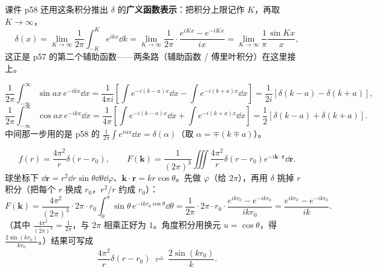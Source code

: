 \documentclass[11pt]{ctexart}
\begin{document}
课件 p58 还用这条积分推出 $\delta$ 的\textbf{广义函数表示}：把积分上限记作 $K$，再取 $K\to\infty$，
\[
\delta(x)=\lim_{K\to\infty}\frac{1}{2\pi}\int_{-K}^{K}e^{ikx}\dd k
=\lim_{K\to\infty}\frac{1}{2\pi}\cdot\frac{e^{iKx}-e^{-iKx}}{ix}
=\lim_{K\to\infty}\frac{1}{\pi}\frac{\sin Kx}{x} ,
\]
这正是 p57 的第二个辅助函数——两条路（辅助函数 / 傅里叶积分）在这里接上。



\[
\frac{1}{2\pi}\int_{-\infty}^{\infty}\sin ax\,e^{-ikx}\dd x
=\frac{1}{4\pi i}\left[\int e^{-i(k-a)x}\dd x-\int e^{-i(k+a)x}\dd x\right]
=\frac{1}{2i}\left[\delta(k-a)-\delta(k+a)\right],
\]
\[
\frac{1}{2\pi}\int_{-\infty}^{\infty}\cos ax\,e^{-ikx}\dd x
=\frac{1}{4\pi}\left[\int e^{-i(k-a)x}\dd x+\int e^{-i(k+a)x}\dd x\right]
=\frac{1}{2}\left[\delta(k-a)+\delta(k+a)\right] .
\]
中间那一步用的是 p58 的 $\frac{1}{2\pi}\int e^{i\alpha x}\dd x=\delta(\alpha)$（取 $\alpha=\mp(k\mp a)$）。



\[ f(r)=\frac{4\pi^{2}}{r}\delta(r-r_0),\qquad
F(\mathbf{k})=\frac{1}{(2\pi)^{3}}\iiint\frac{4\pi^{2}}{r}\delta(r-r_0)e^{-i\mathbf{k}\cdot\mathbf{r}}\dd\mathbf{r} .\]
球坐标下 $\dd\mathbf{r}=r^{2}\dd r\sin\theta\dd\theta\dd\varphi$、$\mathbf{k}\cdot\mathbf{r}=kr\cos\theta$。先做 $\varphi$（给 $2\pi$），再用 $\delta$ 挑掉 $r$ 积分（把每个 $r$ 换成 $r_0$，$r^{2}/r$ 约成 $r_0$）：
\[
F(\mathbf{k})=\frac{4\pi^{2}}{(2\pi)^{3}}\cdot 2\pi\cdot r_0\int_0^{\pi}\sin\theta\,e^{-ikr_0\cos\theta}\dd\theta
=\frac{1}{2\pi}\cdot 2\pi\cdot r_0\cdot\frac{e^{ikr_0}-e^{-ikr_0}}{ikr_0}
=\frac{e^{ikr_0}-e^{-ikr_0}}{ik} .
\]
（其中 $\frac{4\pi^{2}}{(2\pi)^{3}}=\frac{1}{2\pi}$，与 $2\pi$ 相乘正好为 $1$。角度积分用换元 $u=\cos\theta$，得 $\frac{2\sin(kr_0)}{kr_0}$。）结果可写成
\[ \frac{4\pi^{2}}{r}\delta(r-r_0)\ \rightleftharpoons\ \frac{2\sin(kr_0)}{k} .\]
\end{document}
